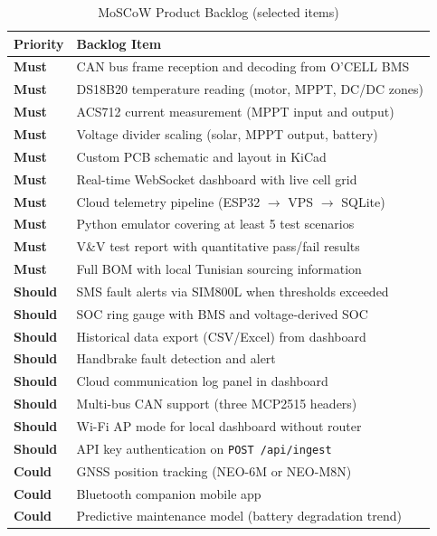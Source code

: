 \begin{table}[H]
\centering
\caption{MoSCoW Product Backlog (selected items)}
\label{tab:moscow}
\small
\begin{tabular}{>{\bfseries}p{1.5cm} p{10.5cm}}
\toprule
Priority & Backlog Item \\
\midrule
\textbf{Must}    & CAN bus frame reception and decoding from O'CELL BMS \\
\textbf{Must}    & DS18B20 temperature reading (motor, MPPT, DC/DC zones) \\
\textbf{Must}    & ACS712 current measurement (MPPT input and output) \\
\textbf{Must}    & Voltage divider scaling (solar, MPPT output, battery) \\
\textbf{Must}    & Custom PCB schematic and layout in KiCad \\
\textbf{Must}    & Real-time WebSocket dashboard with live cell grid \\
\textbf{Must}    & Cloud telemetry pipeline (ESP32 $\rightarrow$ VPS $\rightarrow$ SQLite) \\
\textbf{Must}    & Python emulator covering at least 5 test scenarios \\
\textbf{Must}    & V\&V test report with quantitative pass/fail results \\
\textbf{Must}    & Full BOM with local Tunisian sourcing information \\
\midrule
\textbf{Should}  & SMS fault alerts via SIM800L when thresholds exceeded \\
\textbf{Should}  & SOC ring gauge with BMS and voltage-derived SOC \\
\textbf{Should}  & Historical data export (CSV/Excel) from dashboard \\
\textbf{Should}  & Handbrake fault detection and alert \\
\textbf{Should}  & Cloud communication log panel in dashboard \\
\textbf{Should}  & Multi-bus CAN support (three MCP2515 headers) \\
\textbf{Should}  & Wi-Fi AP mode for local dashboard without router \\
\textbf{Should}  & API key authentication on \texttt{POST /api/ingest} \\
\midrule
\textbf{Could}   & GNSS position tracking (NEO-6M or NEO-M8N) \\
\textbf{Could}   & Bluetooth companion mobile app \\
\textbf{Could}   & Predictive maintenance model (battery degradation trend) \\

\end{tabular}
\end{table}
